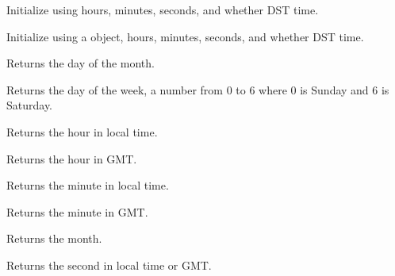 Initialize using hours, minutes, seconds, and whether DST time.

\label{wxtimewxtime}


Initialize using a  object, hours, minutes, seconds, and whether DST time.

\label{wxtimegetday}


Returns the day of the month.

\label{wxtimegetdatofweek}


Returns the day of the week, a number from 0 to 6 where 0 is Sunday and 6 is Saturday.

\label{wxtimegethour}


Returns the hour in local time.

\label{wxtimegethourgmt}


Returns the hour in GMT.

\label{wxtimegetminute}


Returns the minute in local time.

\label{wxtimegetminutegmt}


Returns the minute in GMT.

\label{wxtimegetmonth}


Returns the month.

\label{wxtimegetsecond}


Returns the second in local time or GMT.

\label{wxtimegetsecondgmt}

